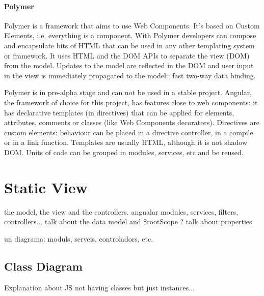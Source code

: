 \paragraph{Polymer} Polymer is a framework that aims to use Web Components. 
It's based on Custom Elements, i.e. everything is a component.
With Polymer developers can compose and encapsulate bits of HTML that can be used in any other templating system or framework.
It uses \ac{HTML} and the \ac{DOM} \acp{API} to separate the view (\ac{DOM}) from the model. 
Updates to the model are reflected in the \ac{DOM} and user input in the view is immediately propagated to the model:: fast two-way data binding.

Polymer is in pre-alpha stage and can not be used in a stable project.
Angular, the framework of choice for this project, has features close to web components: it has declarative templates (in directives) that can be applied for elements, attributes, comments or classes (like Web Components decorators).
Directives are custom elements: behaviour can be placed in a directive controller, in a compile or in a link function.
Templates are usually \ac{HTML}, although it is not shadow \ac{DOM}.
Units of code can be grouped in modules, services, etc and be reused.

\FloatBarrier

\section{Static View}
the model, the view and the controllers. angualar modules, services, filters, controllers...
talk about the data model and \$rootScope ? talk about properties

un diagrama:
moduls, serveis, controladors, etc. 

\subsection{Class Diagram}
Explanation about JS not having classes but just instances...

